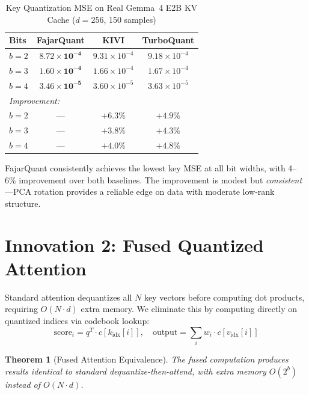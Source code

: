 \documentclass[10pt,twocolumn]{article}
\newtheorem{theorem}{Theorem}
\begin{document}
\begin{table}[t]
\centering
\caption{Key Quantization MSE on Real Gemma~4 E2B KV Cache ($d{=}256$, 150 samples)}
\label{tab:mse_real}
\begin{tabular}{lccc}
\toprule
Bits & FajarQuant & KIVI & TurboQuant \\
\midrule
$b{=}2$ & $\mathbf{8.72 \times 10^{-4}}$ & $9.31 \times 10^{-4}$ & $9.18 \times 10^{-4}$ \\
$b{=}3$ & $\mathbf{1.60 \times 10^{-4}}$ & $1.66 \times 10^{-4}$ & $1.67 \times 10^{-4}$ \\
$b{=}4$ & $\mathbf{3.46 \times 10^{-5}}$ & $3.60 \times 10^{-5}$ & $3.63 \times 10^{-5}$ \\
\midrule
\multicolumn{4}{l}{\textit{Improvement:}} \\
$b{=}2$ & --- & $+6.3\%$ & $+4.9\%$ \\
$b{=}3$ & --- & $+3.8\%$ & $+4.3\%$ \\
$b{=}4$ & --- & $+4.0\%$ & $+4.8\%$ \\
\bottomrule
\end{tabular}
\end{table}

FajarQuant consistently achieves the lowest key MSE at all bit widths, with 4--6\% improvement over both baselines. The improvement is modest but \textit{consistent}---PCA rotation provides a reliable edge on data with moderate low-rank structure.

\section{Innovation 2: Fused Quantized Attention}

Standard attention dequantizes all $N$ key vectors before computing dot products, requiring $O(N \cdot d)$ extra memory. We eliminate this by computing directly on quantized indices via codebook lookup:
\begin{equation}
\text{score}_i = q^T \cdot c[k_{\text{idx}}[i]], \quad
\text{output} = \sum_i w_i \cdot c[v_{\text{idx}}[i]]
\end{equation}

\begin{theorem}[Fused Attention Equivalence]
The fused computation produces results identical to standard dequantize-then-attend, with extra memory $O(2^b)$ instead of $O(N \cdot d)$.
\end{theorem}
\end{document}
